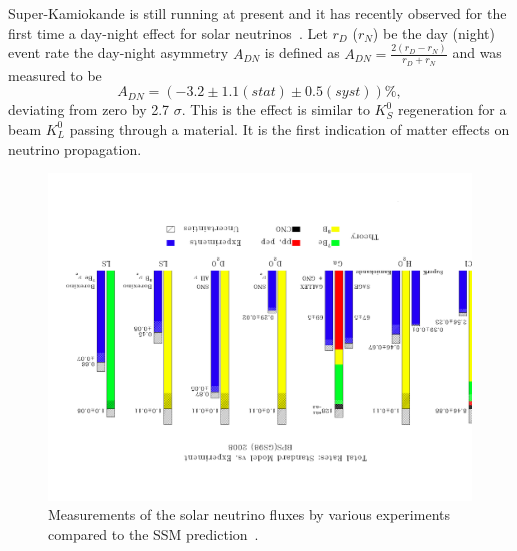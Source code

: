 Super-Kamiokande is still running at present and it has recently observed for the first time a day-night effect for solar neutrinos~\cite{renshaw}. 
Let $r_D$ ($r_N$) be the day (night) event rate
the day-night asymmetry $A_{DN}$ is defined as $A_{DN} = \frac{2 (r_D - r_N) }{r_D + r_N}$ and was measured to be
\begin{equation}
A_{DN} = (−3.2 \pm 1.1 (stat) \pm 0.5 (syst)) \%,
\end{equation} 
deviating from zero by 2.7 $\sigma$.
This is the effect is similar to $K_S^0$ regeneration for a beam $K_L^0$ passing through a material. It is the first indication of matter effects on neutrino propagation. 


\begin{figure}[htbp]
\centering
\includegraphics[angle=180,width=0.8\linewidth]{figures/theoryvsexpsnu1.pdf}
  \caption{
Measurements of the solar neutrino fluxes by various experiments compared to the SSM prediction~\cite{serenellif}.
}
 \label{fig:sol-theoryexp}
 \end{figure}



